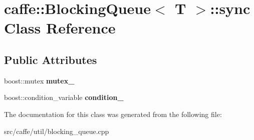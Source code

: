 \hypertarget{classcaffe_1_1BlockingQueue_1_1sync}{}\section{caffe\+:\+:Blocking\+Queue$<$ T $>$\+:\+:sync Class Reference}
\label{classcaffe_1_1BlockingQueue_1_1sync}
\subsection*{Public Attributes}
\begin{DoxyCompactItemize}
\item 
boost\+::mutex {\bfseries mutex\+\_\+}\hypertarget{classcaffe_1_1BlockingQueue_1_1sync_a48aa36f6e5c832e279495cc9a818221a}{}\label{classcaffe_1_1BlockingQueue_1_1sync_a48aa36f6e5c832e279495cc9a818221a}

\item 
boost\+::condition\+\_\+variable {\bfseries condition\+\_\+}\hypertarget{classcaffe_1_1BlockingQueue_1_1sync_acb03aa4056b30fc66cef29872314d63b}{}\label{classcaffe_1_1BlockingQueue_1_1sync_acb03aa4056b30fc66cef29872314d63b}

\end{DoxyCompactItemize}


The documentation for this class was generated from the following file\+:\begin{DoxyCompactItemize}
\item 
src/caffe/util/blocking\+\_\+queue.\+cpp\end{DoxyCompactItemize}
